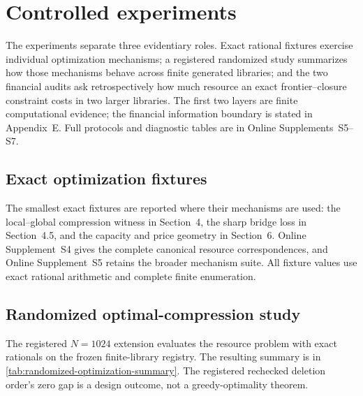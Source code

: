 \section{Controlled experiments}\label{sec:experiments}

The experiments separate three evidentiary roles.  Exact rational fixtures
exercise individual optimization mechanisms; a registered randomized study
summarizes how those mechanisms behave across finite generated libraries; and
the two financial audits ask retrospectively how much resource an exact
frontier--closure constraint costs in two larger libraries.  The first two
layers are finite computational evidence; the financial information boundary
is stated in Appendix~E.  Full protocols and diagnostic tables are in Online
Supplements~S5--S7.

\subsection{Exact optimization fixtures}

The smallest exact fixtures are reported where their mechanisms are used:
the local--global compression witness in Section~4, the sharp bridge loss in
Section~4.5, and the capacity and price geometry in Section~6.  Online
Supplement~S4 gives the complete canonical resource correspondences, and
Online Supplement~S5 retains the broader mechanism suite.  All fixture values
use exact rational arithmetic and complete finite enumeration.

\subsection{Randomized optimal-compression study}

The registered $N=1024$ extension evaluates the resource problem with exact
rationals on the frozen finite-library registry.  The resulting summary is in
\cref{tab:randomized-optimization-summary}.  The registered rechecked deletion
order's zero gap is a design outcome, not a greedy-optimality theorem.

\begin{table}[htbp]
\centering
\small

\caption{Randomized optimal-compression outcomes.  Fractions and integer
counts are exact.  A leading \(\approx\) marks a decimal rendered from an exact
across-trial rational mean; the committed source tables retain the full
fractions and every optimizer tie.  Frequencies describe the registered finite
generator, not a real-library population.}
\label{tab:randomized-optimization-summary}
\end{table}

